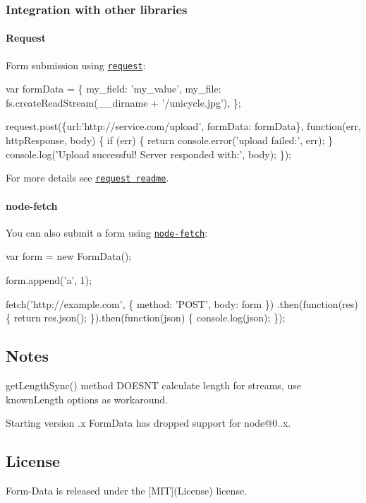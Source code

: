 \subsubsection*{Integration with other libraries}

\paragraph*{Request}

Form submission using \href{https://github.com/request/request}{\tt request}\+:


\begin{DoxyCode}
var formData = \{
  my\_field: 'my\_value',
  my\_file: fs.createReadStream(\_\_dirname + '/unicycle.jpg'),
\};

request.post(\{url:'http://service.com/upload', formData: formData\}, function(err, httpResponse, body) \{
  if (err) \{
    return console.error('upload failed:', err);
  \}
  console.log('Upload successful!  Server responded with:', body);
\});
\end{DoxyCode}


For more details see \href{https://github.com/request/request#multipartform-data-multipart-form-uploads}{\tt request readme}.

\paragraph*{node-\/fetch}

You can also submit a form using \href{https://github.com/bitinn/node-fetch}{\tt node-\/fetch}\+:


\begin{DoxyCode}
var form = new FormData();

form.append('a', 1);

fetch('http://example.com', \{ method: 'POST', body: form \})
    .then(function(res) \{
        return res.json();
    \}).then(function(json) \{
        console.log(json);
    \});
\end{DoxyCode}


\subsection*{Notes}


\begin{DoxyItemize}
\item {\ttfamily get\+Length\+Sync()} method D\+O\+E\+SN\textquotesingle{}T calculate length for streams, use {\ttfamily known\+Length} options as workaround.
\item Starting version {.\+x} Form\+Data has dropped support for {\ttfamily node@0..\+x}.
\end{DoxyItemize}

\subsection*{License}

Form-\/\+Data is released under the \mbox{[}M\+IT\mbox{]}(License) license. 